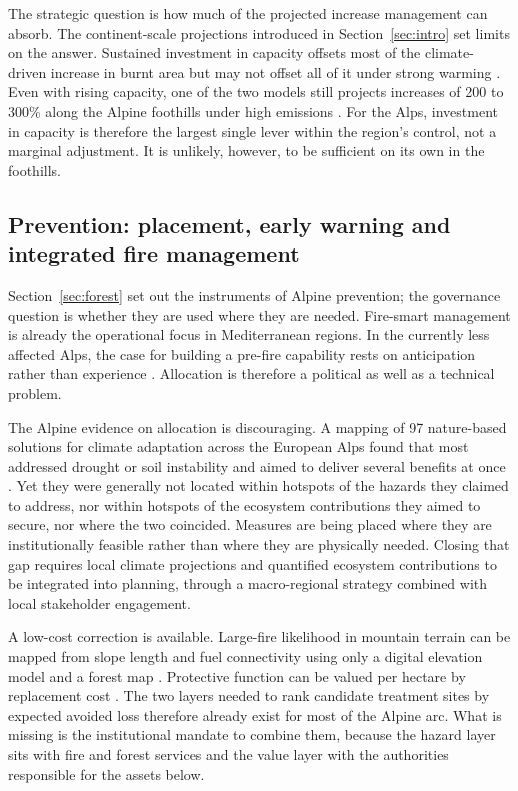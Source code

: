 \documentclass[11pt,a4paper]{article}
\begin{document}
The strategic question is how much of the projected increase management can absorb. The continent-scale projections introduced in Section~\ref{sec:intro} set limits on the answer. Sustained investment in capacity offsets most of the climate-driven increase in burnt area but may not offset all of it under strong warming \citep{billing_future_2026}. Even with rising capacity, one of the two models still projects increases of 200 to 300\% along the Alpine foothills under high emissions \citep{billing_future_2026}. For the Alps, investment in capacity is therefore the largest single lever within the region's control, not a marginal adjustment. It is unlikely, however, to be sufficient on its own in the foothills.

\subsection{Prevention: placement, early warning and integrated fire management}

Section~\ref{sec:forest} set out the instruments of Alpine prevention; the governance question is whether they are used where they are needed. Fire-smart management is already the operational focus in Mediterranean regions. In the currently less affected Alps, the case for building a pre-fire capability rests on anticipation rather than experience \citep{gerberding_mapping_2025}. Allocation is therefore a political as well as a technical problem.

The Alpine evidence on allocation is discouraging. A mapping of 97 nature-based solutions for climate adaptation across the European Alps found that most addressed drought or soil instability and aimed to deliver several benefits at once \citep{dubo_nature-based_2023}. Yet they were generally not located within hotspots of the hazards they claimed to address, nor within hotspots of the ecosystem contributions they aimed to secure, nor where the two coincided. Measures are being placed where they are institutionally feasible rather than where they are physically needed. Closing that gap requires local climate projections and quantified ecosystem contributions to be integrated into planning, through a macro-regional strategy combined with local stakeholder engagement.

A low-cost correction is available. Large-fire likelihood in mountain terrain can be mapped from slope length and fuel connectivity using only a digital elevation model and a forest map \citep{conedera_linking_2024}. Protective function can be valued per hectare by replacement cost \citep{accastello_asforesee_2019}. The two layers needed to rank candidate treatment sites by expected avoided loss therefore already exist for most of the Alpine arc. What is missing is the institutional mandate to combine them, because the hazard layer sits with fire and forest services and the value layer with the authorities responsible for the assets below.
\end{document}
